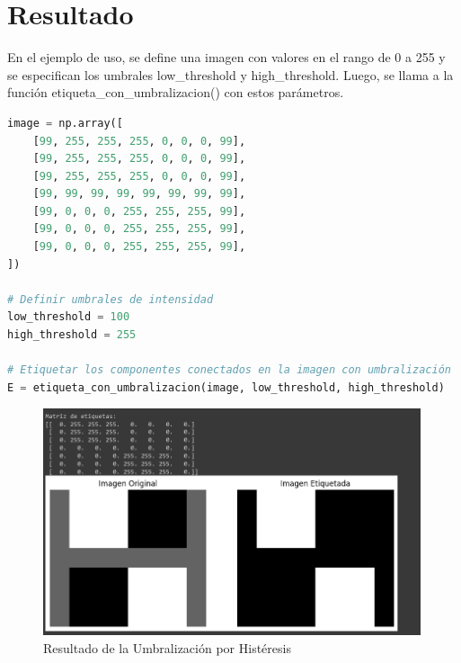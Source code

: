 \documentclass[11pt]{article}
\begin{document}
    \section{Resultado}
    En el ejemplo de uso, se define una imagen con valores en el rango de 0 a 255 y se especifican los umbrales low\_threshold y high\_threshold.
    Luego, se llama a la función etiqueta\_con\_umbralizacion() con estos parámetros.
    \begin{lstlisting}[language=Python, caption=Ejemplo de Uso]
image = np.array([
    [99, 255, 255, 255, 0, 0, 0, 99],
    [99, 255, 255, 255, 0, 0, 0, 99],
    [99, 255, 255, 255, 0, 0, 0, 99],
    [99, 99, 99, 99, 99, 99, 99, 99],
    [99, 0, 0, 0, 255, 255, 255, 99],
    [99, 0, 0, 0, 255, 255, 255, 99],
    [99, 0, 0, 0, 255, 255, 255, 99],
])

# Definir umbrales de intensidad
low_threshold = 100
high_threshold = 255

# Etiquetar los componentes conectados en la imagen con umbralización
E = etiqueta_con_umbralizacion(image, low_threshold, high_threshold)
    \end{lstlisting}

    \begin{figure}[htbp]
        \centering
        \includegraphics[width=0.99\textwidth]{resultado_umbralizacion_histéresis.png}
        \caption{Resultado de la Umbralización por Histéresis}
        \label{fig:resultado}
    \end{figure}
\end{document}
